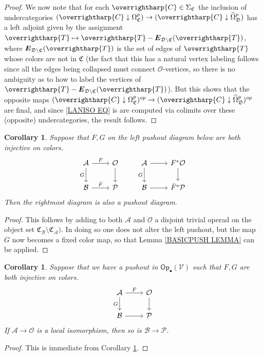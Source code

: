 \documentclass[a4paper,10pt
,draft
]{article}%
\numberwithin{equation}{section}
\numberwithin{figure}{section}
\newtheorem{corollary}[equation]{Corollary}%
\theoremstyle{definition} %
\newcommand{\vect}[1]{\text{\overrightharp{\ensuremath{#1}}}}
\newcommand{\Op}{\mathsf{Op}}%
\newcommand{\V}{\ensuremath{\mathcal V}}
\renewcommand{\O}{\ensuremath{\mathcal O}}
\renewcommand{\P}{\ensuremath{\mathcal P}}
\newcommand{\1}{\ensuremath{\mathbbm 1}}%
\begin{document}
\begin{proof}
We now note that for each 
$\vect{C} \in \Sigma_{\mathfrak{C}}$
the inclusion of undercategories
$(\vect{C} \downarrow \Omega^p_{\mathfrak{C}})
\to
(\vect{C} \downarrow \widehat{\Omega}^p_{\mathfrak{D}})
$
has a left adjoint given by the assignment 
$\vect{T} \mapsto \vect{T} - 
\boldsymbol{E}_{\mathfrak{D} \setminus \mathfrak{C}}(\vect{T})$,
where 
$\boldsymbol{E}_{\mathfrak{D} \setminus \mathfrak{C}}(\vect{T})$
is the set of edges of $\vect{T}$ whose colors are not in $\mathfrak{C}$
(the fact that this has a natural vertex labeling follows since all the edges being collapsed must connect $\mathcal{O}$-vertices, so there is no ambiguity as to how to label the vertices of $\vect{T} - \boldsymbol{E}_{\mathfrak{D} \setminus \mathfrak{C}}(\vect{T})$).
But this shows that the opposite maps 
$(\vect{C} \downarrow \Omega^p_{\mathfrak{C}})^{op}
\to
(\vect{C} \downarrow \widehat{\Omega}^p_{\mathfrak{D}})^{op}$
are final, 
and since \eqref{LANISO EQ} is 
are computed via colimits over these (opposite) undercategories, the result follows.
\end{proof}


\begin{corollary}\label{FGTPUSH COR}
Suppose that $F,G$ on the left pushout diagram below are both injective on colors.
\[
\begin{tikzcd}
	\mathcal{A} \ar{r}{F} \ar{d}[swap]{G} & \mathcal{O} \ar{d}
&
	\mathcal{A} \ar{r} \ar{d}[swap]{G} & F^{\**} \mathcal{O} \ar{d}
\\
	\mathcal{B} \ar{r}{\bar{F}} & \mathcal{P}
&
	\mathcal{B} \ar{r} & \bar{F}^{\**} \mathcal{P}
\end{tikzcd}
\]
Then the rightmost diagram is also a pushout diagram.
\end{corollary}

\begin{proof}
This follows by adding to both $\mathcal{A}$ and $\mathcal{O}$ a disjoint trivial operad on the object set
$\mathfrak{C}_{\mathcal{B}} \setminus \mathfrak{C}_{\mathcal{A}})$.
In doing so one does not alter the left pushout, but the map $G$ now becomes a fixed color map, so that
Lemma \ref{BASICPUSH LEMMA} can be applied.
\end{proof}



\begin{corollary}\label{LOCALISO_COR}
 Suppose that we have a pushout in $\Op_{\bullet}(\V)$ such that $F,G$ are both injective on colors.
\[
\begin{tikzcd}
	\mathcal{A} \arrow[d, "G"'] \arrow[r, "F"]
&
	\O \arrow[d]
\\
	\mathcal{B} \arrow[r]
&
	\P
\end{tikzcd}
\]
	If $\mathcal{A} \to \mathcal{O}$ is a local isomorphism, then so is $\mathcal{B} \to \P$.
\end{corollary}

\begin{proof}
	This is immediate from Corollary \ref{FGTPUSH COR}.      
\end{proof}









{}

\end{document}
